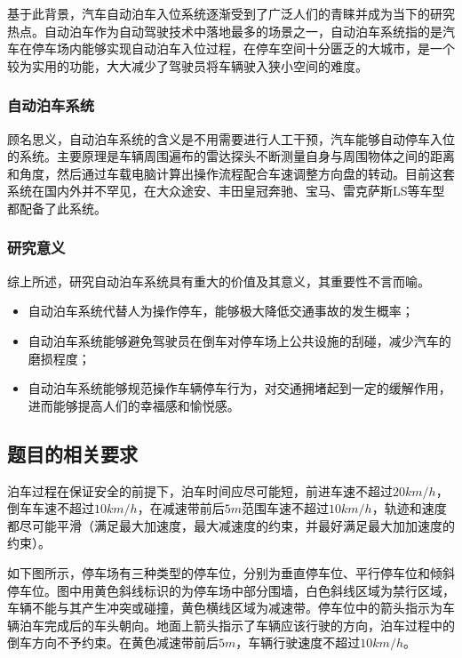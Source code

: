 \documentclass{MathorCupmodeling}
\begin{document}
	基于此背景，汽车自动泊车入位系统逐渐受到了广泛人们的青睐并成为当下的研究热点。自动泊车作为自动驾驶技术中落地最多的场景之一，自动泊车系统指的是汽车在停车场内能够实现自动泊车入位过程，在停车空间十分匮乏的大城市，是一个较为实用的功能，大大减少了驾驶员将车辆驶入狭小空间的难度。

	\subsubsection{自动泊车系统}
	顾名思义，自动泊车系统的含义是不用需要进行人工干预，汽车能够自动停车入位的系统。主要原理是车辆周围遍布的雷达探头不断测量自身与周围物体之间的距离和角度，然后通过车载电脑计算出操作流程配合车速调整方向盘的转动。目前这套系统在国内外并不罕见，在大众途安、丰田皇冠奔驰、宝马、雷克萨斯LS等车型都配备了此系统。
	\subsubsection{研究意义}
	综上所述，研究自动泊车系统具有重大的价值及其意义，其重要性不言而喻。
	\begin{itemize}
		\item 自动泊车系统代替人为操作停车，能够极大降低交通事故的发生概率；
		\item 自动泊车系统能够避免驾驶员在倒车对停车场上公共设施的刮碰，减少汽车的磨损程度；
		\item 自动泊车系统能够规范操作车辆停车行为，对交通拥堵起到一定的缓解作用，进而能够提高人们的幸福感和愉悦感。
	\end{itemize}


	\subsection{题目的相关要求}
	泊车过程在保证安全的前提下，泊车时间应尽可能短，前进车速不超过$20km/h$，倒车车速不超过$10km/h$，在减速带前后$5m$范围车速不超过$10km/h$，轨迹和速度都尽可能平滑（满足最大加速度，最大减速度的约束，并最好满足最大加加速度的约束）。
	
	如下图所示，停车场有三种类型的停车位，分别为垂直停车位、平行停车位和倾斜停车位。图中用黄色斜线标识的为停车场中部分围墙，白色斜线区域为禁行区域，车辆不能与其产生冲突或碰撞，黄色横线区域为减速带。停车位中的箭头指示为车辆泊车完成后的车头朝向。地面上箭头指示了车辆应该行驶的方向，泊车过程中的倒车方向不予约束。在黄色减速带前后$5m$，车辆行驶速度不超过$10km/h$。
	
\end{document}
